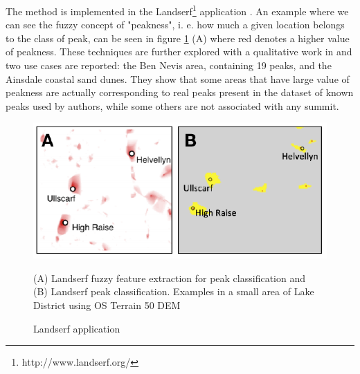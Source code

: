 The method is implemented in the Landserf\footnote{http://www.landserf.org/} application \cite{wood2009geomorphometry}. An example where we can see the fuzzy concept of "peakness", i. e. how much a given location belongs to the class of peak, can be seen in figure \ref{fig:landserf_app} (A) where red denotes a higher value of peakness. These techniques are further explored with a qualitative work in \cite{fisher2005fuzziness} and two use cases are reported: the Ben Nevis area, containing 19 peaks, and the Ainsdale coastal sand dunes. They show that some areas that have large value of peakness are actually corresponding to real peaks present in the dataset of known peaks used by authors, while some others are not associated with any summit.
\begin{figure} 
\centering
\includegraphics[width=14cm]{pictures/landserf_fuzzy_feature_extraction.png}
\caption{Landserf application}
(A) Landserf fuzzy feature extraction for peak classification and \\ (B) Landserf peak classification. Examples in a small area of Lake District using OS Terrain 50 DEM
\label{fig:landserf_app}
\end{figure}
